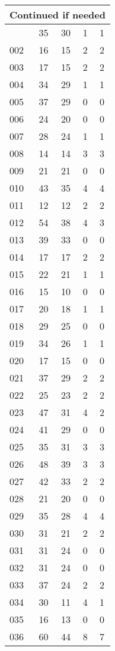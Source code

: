 \begin{center}
\begin{longtable}{l|c|c|c|c}
\hline \multicolumn{5}{|r|}{{Continued if needed}} \\ \hline
\endfoot 
001 & 35 & 30 & 1 & 1\\ \hline
002 & 16 & 15 & 2 & 2\\ \hline
003 & 17 & 15 & 2 & 2\\ \hline
004 & 34 & 29 & 1 & 1\\ \hline
005 & 37 & 29 & 0 & 0\\ \hline
006 & 24 & 20 & 0 & 0\\ \hline
007 & 28 & 24 & 1 & 1\\ \hline
008 & 14 & 14 & 3 & 3\\ \hline
009 & 21 & 21 & 0 & 0\\ \hline
010 & 43 & 35 & 4 & 4\\ \hline
011 & 12 & 12 & 2 & 2\\ \hline
012 & 54 & 38 & 4 & 3\\ \hline
013 & 39 & 33 & 0 & 0\\ \hline
014 & 17 & 17 & 2 & 2\\ \hline
015 & 22 & 21 & 1 & 1\\ \hline
016 & 15 & 10 & 0 & 0\\ \hline
017 & 20 & 18 & 1 & 1\\ \hline
018 & 29 & 25 & 0 & 0\\ \hline
019 & 34 & 26 & 1 & 1\\ \hline
020 & 17 & 15 & 0 & 0\\ \hline
021 & 37 & 29 & 2 & 2\\ \hline
022 & 25 & 23 & 2 & 2\\ \hline
023 & 47 & 31 & 4 & 2\\ \hline
024 & 41 & 29 & 0 & 0\\ \hline
025 & 35 & 31 & 3 & 3\\ \hline
026 & 48 & 39 & 3 & 3\\ \hline
027 & 42 & 33 & 2 & 2\\ \hline
028 & 21 & 20 & 0 & 0\\ \hline
029 & 35 & 28 & 4 & 4\\ \hline
030 & 31 & 21 & 2 & 2\\ \hline
031 & 31 & 24 & 0 & 0\\ \hline
032 & 31 & 24 & 0 & 0\\ \hline
033 & 37 & 24 & 2 & 2\\ \hline
034 & 30 & 11 & 4 & 1\\ \hline
035 & 16 & 13 & 0 & 0\\ \hline
036 & 60 & 44 & 8 & 7\\ \hline

\end{longtable}
\end{center}
